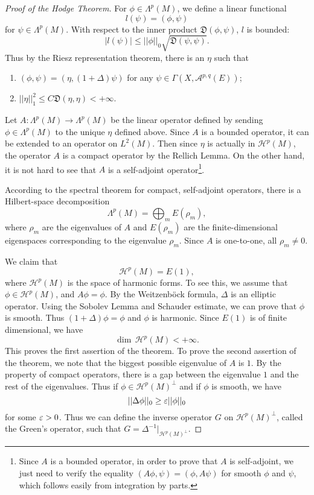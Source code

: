 \begin{proof}[Proof of the Hodge Theorem] For
$\phi\in\Lambda^p(M)$, we define a linear
functional
\[
l(\psi)=(\phi,\psi)
\]
for $\psi\in\Lambda^p(M)$.
With respect to the inner product $\mathfrak D(\phi,\psi)$,
$l$ is bounded:
\[
|l(\psi)|\leq ||\phi||_0\sqrt{\mathfrak D(\psi,\psi)}.
\]
Thus by the Riesz representation theorem, there is an $\eta$
such that
\begin{enumerate}
\item $(\phi,\psi)=(\eta, (1+\Delta)\psi)$ for any
$\psi\in\Gamma(X,\mathcal A^{p,q}(E))$;
\item $||\eta||_1^2\leq C\mathfrak D(\eta,\eta)<+\infty$.
\qquad {}
\end{enumerate}

Let $A: \Lambda^p(M)\rightarrow\Lambda^p(M)$ be the  linear operator defined by sending
$\phi\in\Lambda^p(M)$ to the unique $\eta$ defined
above. Since $A$ is a bounded operator, it can be extended to an operator on $L^2(M)$. Then since
$\eta$ is actually in $\mathcal H^{p}(M)$, the operator
$A$ is a compact operator by the Rellich Lemma.
 On the other hand, it is
not hard to see that  $A$ is a self-adjoint
operator\footnote
{Since $A$ is a bounded operator, in order to prove that
$A$ is self-adjoint, we just need to verify the
equality $(A\phi,\psi)=(\phi,A\psi)$ for smooth $\phi$ and
$\psi$, which follows easily from integration by parts.}.

According to the spectral theorem for compact, self-adjoint
operators, there is a Hilbert-space decomposition
\[
\Lambda^p(M)=\bigoplus_m E(\rho_m),
\]
where $\rho_m$ are the eigenvalues of $A$ and $E(\rho_m)$
are the finite-dimensional eigenspaces corresponding to the
eigenvalue $\rho_m$.
Since
$A$ is one-to-one, all $\rho_m\neq 0$.

We claim that
\[
\mathcal H^p(M)=E(1),
\]
where $\mathcal H^{p}(M)$ is the space of harmonic forms.
To see this, we assume that $\phi\in\mathcal
H^{p}(M)$,
and $A\phi=\phi$.
By the Weitzenb\"ock formula, $\Delta$ is an elliptic
operator.
Using the Sobolev Lemma and Schauder estimate, we can prove that $\phi$ is smooth. Thus $(1+\Delta)\phi=\phi$ and $\phi$ is harmonic.
Since $E(1)$ is of finite dimensional, we have
\[
\dim\,\mathcal H^{p}(M)<+\infty.
\]
This proves the first assertion of the theorem. To prove the
second assertion of the theorem, we note that the biggest
possible eigenvalue of $A$ is $1$. By the property of
compact operators, there is a gap between the eigenvalue $1$
and the rest of the eigenvalues. Thus
if $\phi\in\mathcal H^{p}(M)^\perp$ and if $\phi$ is
smooth, we have
\[
||\Delta\phi||_0\geq\varepsilon||\phi||_0
\]
for some $\varepsilon>0$. Thus we can define the inverse operator
$G$ on $\mathcal H^{p}(M)^\perp$, called the Green's
operator, such that
$G=\Delta^{-1}|_{\mathcal H^{p}(M)^\perp}$.


\end{proof}
